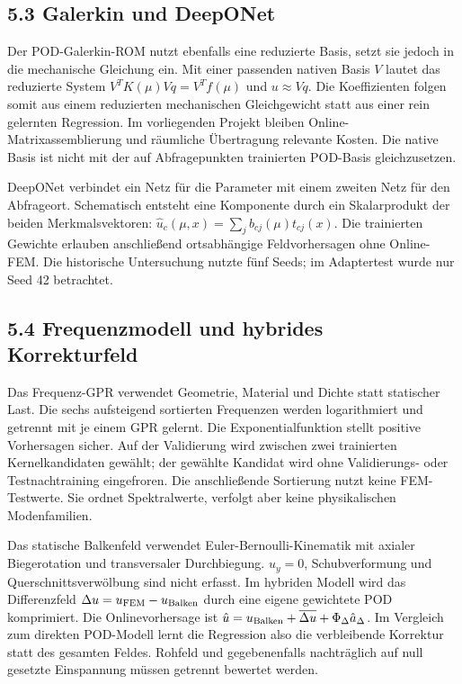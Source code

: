 \documentclass[11pt,a4paper]{article}
\begin{document}
\subsection{5.3 Galerkin und DeepONet}
Der POD-Galerkin-ROM nutzt ebenfalls eine reduzierte Basis, setzt sie jedoch in die mechanische Gleichung ein. Mit einer passenden nativen Basis $V$ lautet das reduzierte System $V^TK(\mu)Vq=V^Tf(\mu)$ und $u\approx Vq$. Die Koeffizienten folgen somit aus einem reduzierten mechanischen Gleichgewicht statt aus einer rein gelernten Regression. Im vorliegenden Projekt bleiben Online-Matrixassemblierung und räumliche Übertragung relevante Kosten. Die native Basis ist nicht mit der auf Abfragepunkten trainierten POD-Basis gleichzusetzen.

DeepONet verbindet ein Netz für die Parameter mit einem zweiten Netz für den Abfrageort. Schematisch entsteht eine Komponente durch ein Skalarprodukt der beiden Merkmalsvektoren: $\hat u_c(\mu,x)=\sum_j b_{cj}(\mu)t_{cj}(x)$. Die trainierten Gewichte erlauben anschließend ortsabhängige Feldvorhersagen ohne Online-FEM. Die historische Untersuchung nutzte fünf Seeds; im Adaptertest wurde nur Seed 42 betrachtet.

\subsection{5.4 Frequenzmodell und hybrides Korrekturfeld}
Das Frequenz-GPR verwendet Geometrie, Material und Dichte statt statischer Last. Die sechs aufsteigend sortierten Frequenzen werden logarithmiert und getrennt mit je einem GPR gelernt. Die Exponentialfunktion stellt positive Vorhersagen sicher. Auf der Validierung wird zwischen zwei trainierten Kernelkandidaten gewählt; der gewählte Kandidat wird ohne Validierungs- oder Testnachtraining eingefroren. Die anschließende Sortierung nutzt keine FEM-Testwerte. Sie ordnet Spektralwerte, verfolgt aber keine physikalischen Modenfamilien.

Das statische Balkenfeld verwendet Euler-Bernoulli-Kinematik mit axialer Biegerotation und transversaler Durchbiegung. $u_y=0$, Schubverformung und Querschnittsverwölbung sind nicht erfasst. Im hybriden Modell wird das Differenzfeld $\Delta u=u_{\rm FEM}-u_{\rm Balken}$ durch eine eigene gewichtete POD komprimiert. Die Onlinevorhersage ist $\hat u=u_{\rm Balken}+\overline{\Delta u}+\Phi_{\Delta}\hat a_{\Delta}$. Im Vergleich zum direkten POD-Modell lernt die Regression also die verbleibende Korrektur statt des gesamten Feldes. Rohfeld und gegebenenfalls nachträglich auf null gesetzte Einspannung müssen getrennt bewertet werden.
\end{document}
